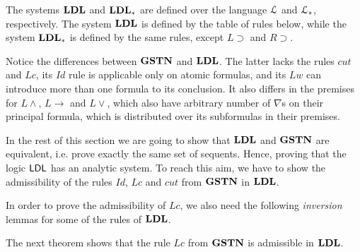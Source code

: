 The systems $\mathbf{LDL}$ and $\mathbf{LDL}_*$ are defined over the language $\mathcal{L}$ and $\mathcal{L}_*$, respectively. The system $\mathbf{LDL}$ is defined by the table of rules below, while the system $\mathbf{LDL}_*$ is defined by the same rules, except $L \supset$ and $R \supset$.


Notice the differences between $\mathbf{GSTN}$ and $\mathbf{LDL}$. The latter lacks the rules $cut$ and $Lc$, its $Id$ rule is applicable only on atomic formulas, and its $Lw$ can introduce more than one formula to its conclusion. It also differs in the premises for $L \wedge$, $L \rightarrow$ and $L \vee$, which also have arbitrary number of $\nabla$s on their principal formula, which is distributed over its subformulas in their premises.

In the rest of this section we are going to show that $\mathbf{LDL}$ and $\mathbf{GSTN}$ are equivalent, i.e. prove exactly the same set of sequents. Hence, proving that the logic $\mathsf{LDL}$ has an analytic system. To reach this aim, we have to show the admissibility of the rules $Id$, $Lc$ and $cut$ from $\mathbf{GSTN}$ in $\mathbf{LDL}$.


In order to prove the admissibility of $Lc$, we also need the following \emph{inversion} lemmas for some of the rules of $\mathbf{LDL}$.


The next theorem shows that the rule $Lc$ from $\mathbf{GSTN}$ is admissible in $\mathbf{LDL}$.
